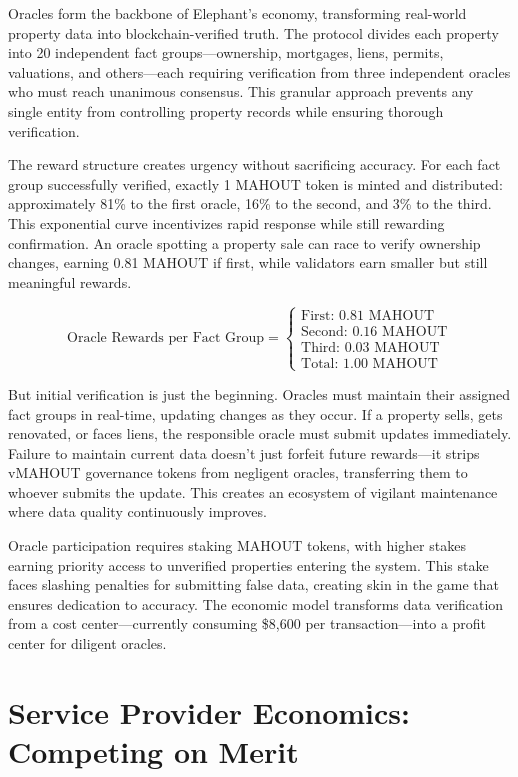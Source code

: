 Oracles form the backbone of Elephant's economy, transforming real-world property data into blockchain-verified truth. The protocol divides each property into 20 independent fact groups—ownership, mortgages, liens, permits, valuations, and others—each requiring verification from three independent oracles who must reach unanimous consensus. This granular approach prevents any single entity from controlling property records while ensuring thorough verification.

The reward structure creates urgency without sacrificing accuracy. For each fact group successfully verified, exactly 1 MAHOUT token is minted and distributed: approximately 81\% to the first oracle, 16\% to the second, and 3\% to the third. This exponential curve incentivizes rapid response while still rewarding confirmation. An oracle spotting a property sale can race to verify ownership changes, earning 0.81 MAHOUT if first, while validators earn smaller but still meaningful rewards.

\[
\text{Oracle Rewards per Fact Group} = \begin{cases}
\text{First: } 0.81 \text{ MAHOUT} \\
\text{Second: } 0.16 \text{ MAHOUT} \\
\text{Third: } 0.03 \text{ MAHOUT} \\
\text{Total: } 1.00 \text{ MAHOUT}
\end{cases}
\]

But initial verification is just the beginning. Oracles must maintain their assigned fact groups in real-time, updating changes as they occur. If a property sells, gets renovated, or faces liens, the responsible oracle must submit updates immediately. Failure to maintain current data doesn't just forfeit future rewards—it strips vMAHOUT governance tokens from negligent oracles, transferring them to whoever submits the update. This creates an ecosystem of vigilant maintenance where data quality continuously improves.

Oracle participation requires staking MAHOUT tokens, with higher stakes earning priority access to unverified properties entering the system. This stake faces slashing penalties for submitting false data, creating skin in the game that ensures dedication to accuracy. The economic model transforms data verification from a cost center—currently consuming \$8,600 per transaction—into a profit center for diligent oracles.

\section{Service Provider Economics: Competing on Merit}

